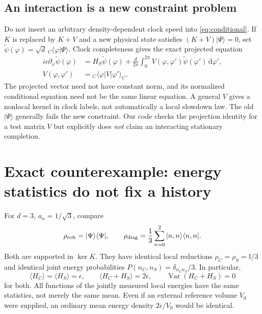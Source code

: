 \documentclass[11pt,a4paper]{article}
\newcommand{\dd}{\mathrm d}
\newcommand{\id}{\mathbb I}
\newcommand{\ket}[1]{|#1\rangle}
\newcommand{\bra}[1]{\langle#1|}
\begin{document}
\subsection*{An interaction is a new constraint problem}
Do not insert an arbitrary density-dependent clock speed into
\eqref{eq:conditional}. If $K$ is replaced by $K+V$ and a new physical
state satisfies $(K+V)\ket\Psi=0$, set
$\widetilde\psi(\varphi)=\sqrt d\,{}_C\bra\varphi\Psi\rangle$.
Clock completeness gives the exact projected equation
\begin{align}
 i\epsilon\partial_\varphi\widetilde\psi(\varphi)
 &=H_S\widetilde\psi(\varphi)
 +\frac d{2\pi}\int_0^{2\pi}
 V(\varphi,\varphi')\widetilde\psi(\varphi')\,\dd\varphi',\\
 V(\varphi,\varphi')&={}_C\bra\varphi V\ket{\varphi'}_C .
\end{align}
The projected vector need not have constant norm, and its normalized
conditional equation need not be the same linear equation. A general
$V$ gives a nonlocal kernel in clock labels, not automatically a local
slowdown law. The old $\ket\Psi$ generally fails the new constraint.
Our code checks the projection identity for a test matrix $V$ but
explicitly does \emph{not} claim an interacting stationary completion.

\newpage
\section{Exact counterexample: energy statistics do not fix a history}
For $d=3$, $a_n=1/\sqrt3$, compare
\begin{equation}
 \rho_{\rm coh}=\ket\Psi\bra\Psi,\qquad
 \rho_{\rm diag}=\frac13\sum_{n=0}^2\ket{n,n}\bra{n,n}.
\end{equation}
Both are supported in $\ker K$. They have identical local reductions
$\rho_C=\rho_S=\id/3$ and identical joint energy probabilities
$P(n_C,n_S)=\delta_{n_Cn_S}/3$. In particular,
\begin{equation}
 \langle H_C\rangle=\langle H_S\rangle=\epsilon,\qquad
 \langle H_C+H_S\rangle=2\epsilon,\qquad
 \operatorname{Var}(H_C+H_S)=0
\end{equation}
for both. All functions of the jointly measured local energies have
the same statistics, not merely the same mean. Even if an external
reference volume $V_0$ were supplied, an ordinary mean energy density
$2\epsilon/V_0$ would be identical.
\end{document}
